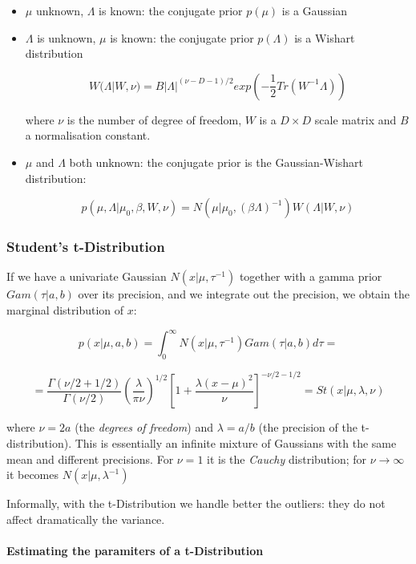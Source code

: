\documentclass{article}
\begin{document}
\begin{itemize}
\item
  \(\mu\) unknown, \(\Lambda\) is known: the conjugate prior \(p(\mu)\)
  is a Gaussian
\item
  \(\Lambda\) is unknown, \(\mu\) is known: the conjugate prior
  \(p(\Lambda)\) is a Wishart distribution

  \[W(\Lambda | W, \nu) = B | \Lambda |^{(\nu - D - 1) / 2} exp(-\frac{1}{2}Tr(W^{-1}\Lambda))\]

  where \(\nu\) is the number of degree of freedom, \(W\) is a
  \(D \times D\) scale matrix and \(B\) a normalisation constant.
\item
  \(\mu\) and \(\Lambda\) both unknown: the conjugate prior is the
  Gaussian-Wishart distribution:

  \[p(\mu, \Lambda | \mu_0, \beta, W, \nu) = N(\mu | \mu_0, (\beta \Lambda)^{-1}) W(\Lambda | W, \nu)\]
\end{itemize}

\subsubsection{Student's t-Distribution}\label{students-t-distribution}

If we have a univariate Gaussian \(N(x | \mu, \tau^{-1})\) together with
a gamma prior \(Gam(\tau | a, b)\) over its precision, and we integrate
out the precision, we obtain the marginal distribution of \(x\):

\[p(x | \mu, a, b) = \int_{0}^{\infty } N(x | \mu, \tau^{-1}) Gam(\tau | a, b)
d\tau = \]

\[= \frac{\Gamma(\nu / 2 + 1/2)}{\Gamma (\nu / 2)} (\frac{\lambda}{\pi \nu})^{1/2} [ 1 + \frac{\lambda (x - \mu)^2}{\nu} ]^{-\nu / 2 - 1 / 2} = St(x | \mu, \lambda, \nu)\]

where \(\nu = 2a\) (the \emph{degrees of freedom}) and
\(\lambda = a / b\) (the precision of the t-distribution). This is
essentially an infinite mixture of Gaussians with the same mean and
different precisions. For \(\nu = 1\) it is the \emph{Cauchy}
distribution; for \(\nu \rightarrow \infty\) it becomes
\(N(x | \mu, \lambda^{-1})\)

Informally, with the t-Distribution we handle better the outliers: they
do not affect dramatically the variance.

\paragraph{Estimating the paramiters of a
t-Distribution}\label{estimating-the-paramiters-of-a-t-distribution}
\end{document}
